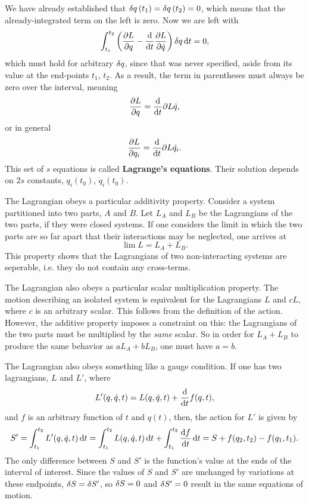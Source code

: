 \documentclass{book}
\begin{document}
%
We have already established that $\var{q}(t_1) = \var{q}(t_2) = 0$, which means that the already-integrated term on the left is zero. Now we are left with
%
\begin{equation}
  \int_{t_1}^{t_2} \qty( \pdv{L}{q} - \dv{t} \pdv{L}{\dot{q}} ) \var{q} \dd{t} =
  0,
\end{equation}
%
which must hold for arbitrary $\var{q}$, since that was never specified, aside from its value at the end-points $t_1$, $t_2$. As a result, the term in parentheses must always be zero over the interval, meaning
%
\begin{equation}
  \pdv{L}{q} = \dv{t} \partial{L}{\dot{q}},
\end{equation}
%
or in general
%
\begin{equation}
  \pdv{L}{q_i} = \dv{t} \partial{L}{\dot{q_i}}.
\end{equation}
%
This set of $s$ equations is called \textbf{Lagrange's equations}. Their solution depends on $2s$ constants, $q_i(t_0)$, $\dot{q}_i(t_0)$.

The Lagrangian obeys a particular additivity property. Consider a system partitioned into two parts, $A$ and $B$. Let $L_A$ and $L_B$ be the Lagrangians of the two parts, if they were closed systems. If one considers the limit in which the two parts are so far apart that their interactions may be neglected, one arrives at
%
\begin{equation}
  \lim L = L_A + L_B.
\end{equation}
%
This property shows that the Lagrangians of two non-interacting systems are seperable, i.e. they do not contain any cross-terms.

The Lagrangian also obeys a particular scalar multiplication property. The motion describing an isolated system is equivalent for the Lagrangians $L$ and $c L$, where $c$ is an arbitrary scalar. This follows from the definition of the action. However, the additive property imposes a constraint on this: the Lagrangians of the two parts must be multiplied by the \emph{same} scalar. So in order for $L_A + L_B$ to produce the same behavior as $a L_A + b L_B$, one must have $a = b$.

The Lagrangian also obeys something like a gauge condition. If one has two lagrangians, $L$ and $L'$, where
%
\begin{equation}
  L'(q, \dot{q}, t) = L(q, \dot{q}, t) + \dv{t} f(q, t),
\end{equation}
%
and $f$ is an arbitrary function of $t$ and $q(t)$, then, the action for $L'$ is given by
%
\begin{equation}
  S' =
  \int_{t_1}^{t_2} L'(q, \dot{q}, t) \dd{t} =
  \int_{t_1}^{t_2} L(q, \dot{q}, t) \dd{t} + \int_{t_1}^{t_2} \dv{f}{t} \dd{t} =
  S + f(q_2, t_2) - f(q_1, t_1).
\end{equation}
%
The only difference between $S$ and $S'$ is the function's value at the ends of the interval of interest. Since the values of $S$ and $S'$ are unchanged by variations at these endpoints, $\var{S} = \var{S'}$, so $\var{S} = 0$ and $\var{S'} = 0$ result in the same equations of motion.
\end{document}
